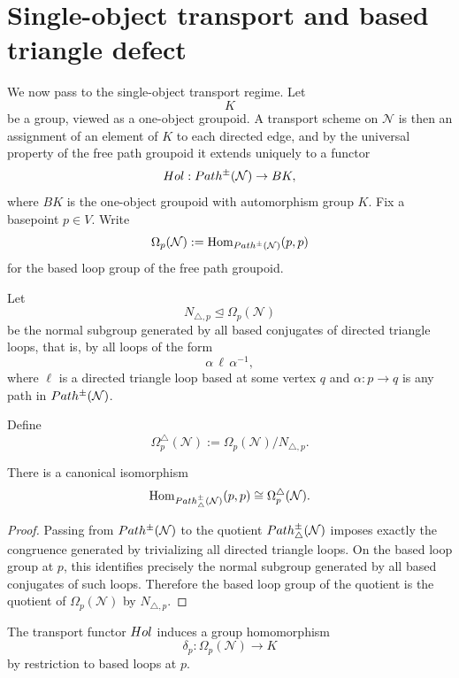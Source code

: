 \section{Single-object transport and based triangle defect}
We now pass to the single-object transport regime.  Let
\[
	K
\]
be a group, viewed as a one-object groupoid.  A transport scheme on
\(\mathcal N\) is then an assignment of an element of \(K\) to each
directed edge, and by the universal property of the free path groupoid
it extends uniquely to a functor
\[
	Hol:Path^\pm(\mathcal N)\to BK,
\]
where \(BK\) is the one-object groupoid with automorphism group \(K\).
Fix a basepoint \(p\in V\).  Write
\[
	\Omega_p(\mathcal N):=\operatorname{Hom}_{Path^\pm(\mathcal N)}(p,p)
\]
for the based loop group of the free path groupoid.
\begin{definition}
	Let
	\[
		N_{\triangle,p}\trianglelefteq \Omega_p(\mathcal N)
	\]
	be the normal subgroup generated by all based conjugates of directed
	triangle loops, that is, by all loops of the form
	\[
		\alpha\,\ell\,\alpha^{-1},
	\]
	where \(\ell\) is a directed triangle loop based at some vertex \(q\)
	and \(\alpha:p\to q\) is any path in \(Path^\pm(\mathcal N)\).
\end{definition}
\begin{definition}
	Define
	\[
		\Omega_p^\triangle(\mathcal N)
		:=
		\Omega_p(\mathcal N)/N_{\triangle,p}.
	\]
\end{definition}
\begin{lemma}
	\label{lem:triangle-based-loops}
	There is a canonical isomorphism
	\[
		\operatorname{Hom}_{Path^\pm_\triangle(\mathcal N)}(p,p)
		\cong
		\Omega_p^\triangle(\mathcal N).
	\]
\end{lemma}
\begin{proof}
	Passing from \(Path^\pm(\mathcal N)\) to the quotient
	\(Path^\pm_\triangle(\mathcal N)\) imposes exactly the congruence
	generated by trivializing all directed triangle loops.  On the based
	loop group at \(p\), this identifies precisely the normal subgroup
	generated by all based conjugates of such loops.  Therefore the based
	loop group of the quotient is the quotient of \(\Omega_p(\mathcal N)\)
	by \(N_{\triangle,p}\).
\end{proof}
\begin{definition}
	The transport functor \(Hol\) induces a group homomorphism
	\[
		\delta_p:\Omega_p(\mathcal N)\to K
	\]
	by restriction to based loops at \(p\).
\end{definition}
